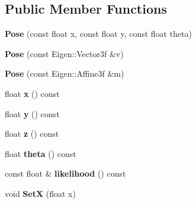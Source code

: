 \subsection*{Public Member Functions}
\begin{DoxyCompactItemize}
\item 
\hypertarget{classdepth__clustering_1_1Pose_a776425156ff6d177a3f74bb81b322e34}{{\bfseries Pose} (const float x, const float y, const float theta)}\label{classdepth__clustering_1_1Pose_a776425156ff6d177a3f74bb81b322e34}

\item 
\hypertarget{classdepth__clustering_1_1Pose_a667cea1e30e54fbe31ff2386d3704184}{{\bfseries Pose} (const Eigen\-::\-Vector3f \&v)}\label{classdepth__clustering_1_1Pose_a667cea1e30e54fbe31ff2386d3704184}

\item 
\hypertarget{classdepth__clustering_1_1Pose_ac40f03706f9d27f14f64aabc49f947c9}{{\bfseries Pose} (const Eigen\-::\-Affine3f \&m)}\label{classdepth__clustering_1_1Pose_ac40f03706f9d27f14f64aabc49f947c9}

\item 
\hypertarget{classdepth__clustering_1_1Pose_a08b24dddbbbf56f37c132f9de477cedb}{float {\bfseries x} () const }\label{classdepth__clustering_1_1Pose_a08b24dddbbbf56f37c132f9de477cedb}

\item 
\hypertarget{classdepth__clustering_1_1Pose_a9ab0ede24c3dec1abc7da907d9b15ffc}{float {\bfseries y} () const }\label{classdepth__clustering_1_1Pose_a9ab0ede24c3dec1abc7da907d9b15ffc}

\item 
\hypertarget{classdepth__clustering_1_1Pose_a0fc665b764f5b26a078a712ff41334d8}{float {\bfseries z} () const }\label{classdepth__clustering_1_1Pose_a0fc665b764f5b26a078a712ff41334d8}

\item 
\hypertarget{classdepth__clustering_1_1Pose_aaf05e4e27b02a858abb077852fc1e9dc}{float {\bfseries theta} () const }\label{classdepth__clustering_1_1Pose_aaf05e4e27b02a858abb077852fc1e9dc}

\item 
\hypertarget{classdepth__clustering_1_1Pose_a549131f31d3a126a0d1b62377c0601c1}{const float \& {\bfseries likelihood} () const }\label{classdepth__clustering_1_1Pose_a549131f31d3a126a0d1b62377c0601c1}

\item 
\hypertarget{classdepth__clustering_1_1Pose_a46a6316ba2b6fa0dca276ac60893d2ba}{void {\bfseries Set\-X} (float x)}\label{classdepth__clustering_1_1Pose_a46a6316ba2b6fa0dca276ac60893d2ba}


\end{DoxyCompactItemize}
